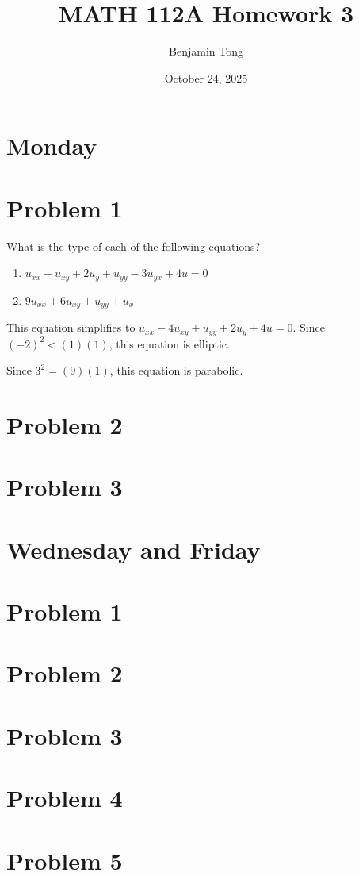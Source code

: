 \documentclass{ben}
\title{MATH 112A Homework 3}
\author{Benjamin Tong}
\date{October 24, 2025}
\begin{document}
\maketitle
\section{Monday}
\section{Problem 1}
What is the type of each of the following equations?
\begin{enumerate}
    \item $u_{xx} - u_{xy} + 2 u_y + u_{yy} - 3 u_{yx} + 4u = 0$
    \item $9u_{xx} + 6u_{xy} + u_{yy} + u_{x}$
\end{enumerate}
\begin{multipart}
    \item This equation simplifies to $u_{xx} - 4u_{xy} + u_{yy} + 2 u_y + 4u = 0$.
    Since $(-2)^2 < (1)(1)$, this equation is elliptic.
    \item Since $3^2 = (9)(1)$, this equation is parabolic.
\end{multipart}
\section{Problem 2}
\section{Problem 3}
\section{Wednesday and Friday}
\section{Problem 1}
\section{Problem 2}
\section{Problem 3}
\section{Problem 4}
\section{Problem 5}
\end{document}
